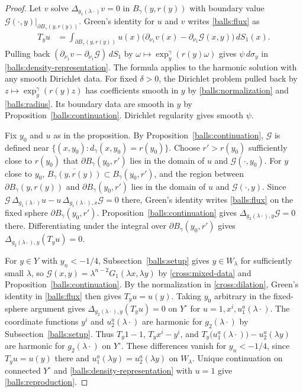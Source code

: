 \documentclass[11pt,a4paper]{article}
\theoremstyle{definition}
\theoremstyle{remark}
\numberwithin{equation}{section}
\begin{document}
\begin{proof}
Let $v$ solve $\Delta_{g_1(\lambda\cdot)}v=0$ in $B_\gamma(y,r(y))$
with boundary value $\mathcal G(\cdot,y)|_{\partial B_\gamma(y,r(y))}$.
Green's identity for $u$ and $v$ writes \eqref{balls:flux} as
\begin{align*}
 T_yu
 &=\int_{\partial B_\gamma(y,r(y))}
 u(x)\bigl(\partial_{\nu_1}v(x)
       -\partial_{\nu_1}\mathcal G(x,y)\bigr)\,dS_1(x).
\end{align*}
Pulling back $(\partial_{\nu_1}v-\partial_{\nu_1}\mathcal G)\,dS_1$
by $\omega\mapsto\exp_y^\gamma(r(y)\omega)$ gives $\psi\,d\sigma_y$
in \eqref{balls:density-representation}. The formula applies to the
harmonic solution with any smooth Dirichlet data. For fixed $\delta>0$,
the Dirichlet problem pulled back by $z\mapsto\exp_y^\gamma(r(y)z)$
has coefficients smooth in $y$ by \eqref{balls:normalization} and
\eqref{balls:radius}. Its boundary data are smooth in $y$ by
Proposition~\ref{balls:continuation}. Dirichlet regularity gives
smooth $\psi$.

Fix $y_0$ and $u$ as in the proposition. By
Proposition~\ref{balls:continuation}, $\mathcal G$ is defined near
$\{(x,y_0):d_\gamma(x,y_0)=r(y_0)\}$. Choose $r'>r(y_0)$ sufficiently
close to $r(y_0)$ that $\partial B_\gamma(y_0,r')$ lies in the domain of
$u$ and $\mathcal G(\cdot,y_0)$. For $y$ close to $y_0$,
$\overline{B_\gamma(y,r(y))}\subset B_\gamma(y_0,r')$, and the region between
$\partial B_\gamma(y,r(y))$ and $\partial B_\gamma(y_0,r')$ lies in
the domain of $u$ and $\mathcal G(\cdot,y)$. Since
$\mathcal G\,\Delta_{g_1(\lambda\cdot)}u
-u\,\Delta_{g_1(\lambda\cdot),x}\mathcal G=0$ there, Green's identity
writes \eqref{balls:flux} on the fixed sphere $\partial B_\gamma(y_0,r')$.
Proposition~\ref{balls:continuation} gives
$\Delta_{g_2(\lambda\cdot),y}\mathcal G=0$ there. Differentiating under
the integral over $\partial B_\gamma(y_0,r')$ gives
$\Delta_{g_2(\lambda\cdot),y}(T_yu)=0$.

For $y\in Y$ with $y_n<-1/4$, Subsection~\ref{balls:setup} gives
$y\in W_\lambda$ for sufficiently small $\lambda$, so
$\mathcal G(x,y)=\lambda^{n-2}G_1(\lambda x,\lambda y)$ by
\eqref{cross:mixed-data} and Proposition~\ref{balls:continuation}.
By the normalization in \eqref{cross:dilation}, Green's identity
in \eqref{balls:flux} then gives $T_yu=u(y)$.
Taking $y_0$ arbitrary in the fixed-sphere argument gives
$\Delta_{g_2(\lambda\cdot),y}(T_yu)=0$ on $Y^\circ$ for
$u=1,x^i,u_1^a(\lambda\cdot)$. The coordinate functions $y^i$
and $u_2^a(\lambda\cdot)$ are harmonic for $g_2(\lambda\cdot)$ by
Subsection~\ref{balls:setup}. Thus $T_y1-1$, $T_yx^i-y^i$, and
$T_y\bigl(u_1^a(\lambda\cdot)\bigr)-u_2^a(\lambda y)$ are harmonic
for $g_2(\lambda\cdot)$ on $Y^\circ$. These differences vanish for
$y_n<-1/4$, since $T_yu=u(y)$ there and
$u_1^a(\lambda y)=u_2^a(\lambda y)$ on $W_\lambda$. Unique
continuation on connected $Y^\circ$ and
\eqref{balls:density-representation} with $u=1$ give
\eqref{balls:reproduction}.


\end{proof}
\end{document}

